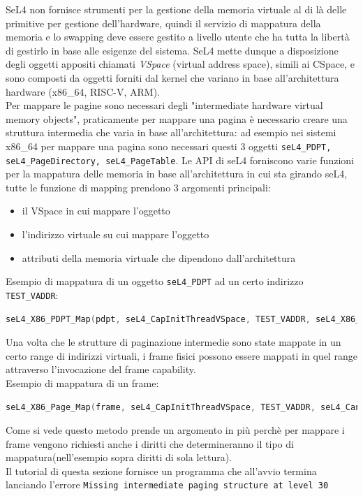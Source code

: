 SeL4 non fornisce strumenti per la gestione della memoria virtuale al di là delle primitive per gestione dell'hardware, quindi il servizio di mappatura della memoria e lo swapping deve essere gestito a livello utente che ha tutta la libertà di gestirlo in base alle esigenze del sistema. SeL4 mette dunque a disposizione degli oggetti appositi chiamati \textit{VSpace} (virtual address space), simili ai CSpace, e sono composti da oggetti forniti dal kernel che variano in base all'architettura hardware (x86\_64, RISC-V, ARM).\\
Per mappare le pagine sono necessari degli "intermediate hardware virtual memory objects", praticamente per mappare una pagina è necessario creare una struttura intermedia che varia in base all'architettura: ad esempio nei sistemi x86\_64 per mappare una pagina sono necessari questi 3 oggetti \texttt{seL4\_PDPT, seL4\_PageDirectory, seL4\_PageTable}. Le API di seL4 forniscono varie funzioni per la mappatura delle memoria in base all'architettura in cui sta girando seL4, tutte le funzione di mapping prendono 3 argomenti principali:
\begin{itemize}
	\item il VSpace in cui mappare l'oggetto
	\item l'indirizzo virtuale su cui mappare l'oggetto
	\item attributi della memoria virtuale che dipendono dall'architettura 
\end{itemize}
Esempio di mappatura di un oggetto \texttt{seL4\_PDPT} ad un certo indirizzo \texttt{TEST\_VADDR}:
\begin{lstlisting}[language=C++]
seL4_X86_PDPT_Map(pdpt, seL4_CapInitThreadVSpace, TEST_VADDR, seL4_X86_Default_VMAttributes);
\end{lstlisting}
Una volta che le strutture di paginazione intermedie sono state mappate in un certo range di indirizzi virtuali, i frame fisici possono essere mappati in quel range attraverso l'invocazione del frame capability.\\
Esempio di mappatura di un frame:
\begin{lstlisting}[language=C++]
seL4_X86_Page_Map(frame, seL4_CapInitThreadVSpace, TEST_VADDR, seL4_CanRead, seL4_X86_Default_VMAttributes);
\end{lstlisting}
Come si vede questo metodo prende un argomento in più perchè per mappare i frame vengono richiesti anche i diritti che determineranno il tipo di mappatura(nell'esempio sopra diritti di sola lettura).\\
Il tutorial di questa sezione fornisce un programma che all'avvio termina lanciando l'errore \texttt{Missing intermediate paging structure at level 30} 

